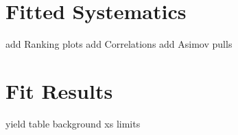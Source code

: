 \chapter{Fitted Systematics}
add Ranking plots 
add Correlations
add Asimov pulls

\chapter{Fit Results}
yield table
background xs
limits
